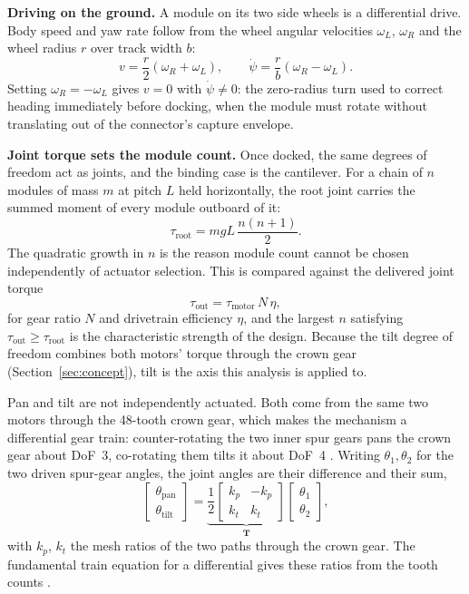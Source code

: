 \documentclass[11pt,a4paper]{article}
\newif\ifreview
\newcommand{\pending}[1]{\ifreview{\color{blue}#1}\else#1\fi}
\begin{document}
\pending{%
\noindent\textbf{Driving on the ground.} A module on its two side wheels is a
differential drive. Body speed and yaw rate follow from the wheel angular
velocities $\omega_L$, $\omega_R$ and the wheel radius $r$ over track width
$b$:
\begin{equation}
  v = \frac{r}{2}\left(\omega_R + \omega_L\right),
  \qquad
  \dot{\psi} = \frac{r}{b}\left(\omega_R - \omega_L\right).
\end{equation}
Setting $\omega_R = -\omega_L$ gives $v = 0$ with $\dot{\psi} \neq 0$: the
zero-radius turn used to correct heading immediately before docking, when the
module must rotate without translating out of the connector's capture envelope.

\noindent\textbf{Joint torque sets the module count.} Once docked, the same
degrees of freedom act as joints, and the binding case is the cantilever. For a
chain of $n$ modules of mass $m$ at pitch $L$ held horizontally, the root joint
carries the summed moment of every module outboard of it:
\begin{equation}
  \tau_{\text{root}} = mgL\,\frac{n(n+1)}{2}.
  \label{eq:cantilever}
\end{equation}
The quadratic growth in $n$ is the reason module count cannot be chosen
independently of actuator selection. This is compared against the delivered
joint torque
\begin{equation}
  \tau_{\text{out}} = \tau_{\text{motor}}\,N\,\eta ,
\end{equation}
for gear ratio $N$ and drivetrain efficiency $\eta$, and the largest $n$
satisfying $\tau_{\text{out}} \geq \tau_{\text{root}}$ is the characteristic
strength of the design. Because the tilt degree of freedom combines both
motors' torque through the crown gear (Section~\ref{sec:concept}), tilt is the
axis this analysis is applied to.

Pan and tilt are not independently actuated. Both come from the same two
motors through the 48-tooth crown gear, which makes the mechanism a differential
gear train: counter-rotating the two inner spur gears pans the crown gear about
DoF~3, co-rotating them tilts it about DoF~4 \cite{davey2012}. Writing
$\theta_1,\theta_2$ for the two driven spur-gear angles, the joint angles are
their difference and their sum,
\begin{equation}
  \begin{bmatrix} \theta_{\text{pan}} \\ \theta_{\text{tilt}} \end{bmatrix}
  = \underbrace{\frac{1}{2}\begin{bmatrix} k_p & -k_p \\ k_t & k_t \end{bmatrix}}_{\textstyle \mathbf{T}}
    \begin{bmatrix} \theta_1 \\ \theta_2 \end{bmatrix},
  \label{eq:diff}
\end{equation}
with $k_p$, $k_t$ the mesh ratios of the two paths through the crown gear. The
fundamental train equation for a differential gives these ratios from the tooth
counts \cite{tsai1999}.

}
\end{document}
